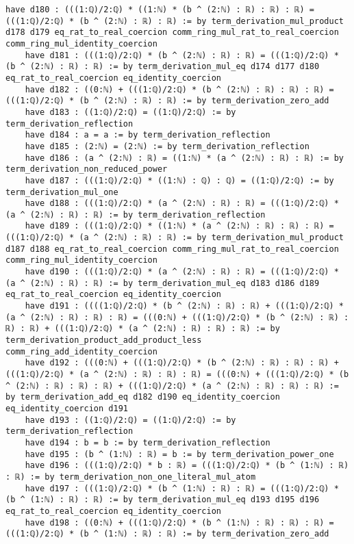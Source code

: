\documentclass{article}
\begin{document}
\begin{tcolorbox}[colback=white!10, width=\linewidth]
\begin{lstlisting}[language=Lean4]
    have d180 : (((1:ℚ)/2:ℚ) * ((1:ℕ) * (b ^ (2:ℕ) : ℝ) : ℝ) : ℝ) = (((1:ℚ)/2:ℚ) * (b ^ (2:ℕ) : ℝ) : ℝ) := by term_derivation_mul_product d178 d179 eq_rat_to_real_coercion comm_ring_mul_rat_to_real_coercion comm_ring_mul_identity_coercion
    have d181 : (((1:ℚ)/2:ℚ) * (b ^ (2:ℕ) : ℝ) : ℝ) = (((1:ℚ)/2:ℚ) * (b ^ (2:ℕ) : ℝ) : ℝ) := by term_derivation_mul_eq d174 d177 d180 eq_rat_to_real_coercion eq_identity_coercion
    have d182 : ((0:ℕ) + (((1:ℚ)/2:ℚ) * (b ^ (2:ℕ) : ℝ) : ℝ) : ℝ) = (((1:ℚ)/2:ℚ) * (b ^ (2:ℕ) : ℝ) : ℝ) := by term_derivation_zero_add
    have d183 : ((1:ℚ)/2:ℚ) = ((1:ℚ)/2:ℚ) := by term_derivation_reflection
    have d184 : a = a := by term_derivation_reflection
    have d185 : (2:ℕ) = (2:ℕ) := by term_derivation_reflection
    have d186 : (a ^ (2:ℕ) : ℝ) = ((1:ℕ) * (a ^ (2:ℕ) : ℝ) : ℝ) := by term_derivation_non_reduced_power
    have d187 : (((1:ℚ)/2:ℚ) * ((1:ℕ) : ℚ) : ℚ) = ((1:ℚ)/2:ℚ) := by term_derivation_mul_one
    have d188 : (((1:ℚ)/2:ℚ) * (a ^ (2:ℕ) : ℝ) : ℝ) = (((1:ℚ)/2:ℚ) * (a ^ (2:ℕ) : ℝ) : ℝ) := by term_derivation_reflection
    have d189 : (((1:ℚ)/2:ℚ) * ((1:ℕ) * (a ^ (2:ℕ) : ℝ) : ℝ) : ℝ) = (((1:ℚ)/2:ℚ) * (a ^ (2:ℕ) : ℝ) : ℝ) := by term_derivation_mul_product d187 d188 eq_rat_to_real_coercion comm_ring_mul_rat_to_real_coercion comm_ring_mul_identity_coercion
    have d190 : (((1:ℚ)/2:ℚ) * (a ^ (2:ℕ) : ℝ) : ℝ) = (((1:ℚ)/2:ℚ) * (a ^ (2:ℕ) : ℝ) : ℝ) := by term_derivation_mul_eq d183 d186 d189 eq_rat_to_real_coercion eq_identity_coercion
    have d191 : ((((1:ℚ)/2:ℚ) * (b ^ (2:ℕ) : ℝ) : ℝ) + (((1:ℚ)/2:ℚ) * (a ^ (2:ℕ) : ℝ) : ℝ) : ℝ) = (((0:ℕ) + (((1:ℚ)/2:ℚ) * (b ^ (2:ℕ) : ℝ) : ℝ) : ℝ) + (((1:ℚ)/2:ℚ) * (a ^ (2:ℕ) : ℝ) : ℝ) : ℝ) := by term_derivation_product_add_product_less comm_ring_add_identity_coercion
    have d192 : (((0:ℕ) + (((1:ℚ)/2:ℚ) * (b ^ (2:ℕ) : ℝ) : ℝ) : ℝ) + (((1:ℚ)/2:ℚ) * (a ^ (2:ℕ) : ℝ) : ℝ) : ℝ) = (((0:ℕ) + (((1:ℚ)/2:ℚ) * (b ^ (2:ℕ) : ℝ) : ℝ) : ℝ) + (((1:ℚ)/2:ℚ) * (a ^ (2:ℕ) : ℝ) : ℝ) : ℝ) := by term_derivation_add_eq d182 d190 eq_identity_coercion eq_identity_coercion d191
    have d193 : ((1:ℚ)/2:ℚ) = ((1:ℚ)/2:ℚ) := by term_derivation_reflection
    have d194 : b = b := by term_derivation_reflection
    have d195 : (b ^ (1:ℕ) : ℝ) = b := by term_derivation_power_one
    have d196 : (((1:ℚ)/2:ℚ) * b : ℝ) = (((1:ℚ)/2:ℚ) * (b ^ (1:ℕ) : ℝ) : ℝ) := by term_derivation_non_one_literal_mul_atom
    have d197 : (((1:ℚ)/2:ℚ) * (b ^ (1:ℕ) : ℝ) : ℝ) = (((1:ℚ)/2:ℚ) * (b ^ (1:ℕ) : ℝ) : ℝ) := by term_derivation_mul_eq d193 d195 d196 eq_rat_to_real_coercion eq_identity_coercion
    have d198 : ((0:ℕ) + (((1:ℚ)/2:ℚ) * (b ^ (1:ℕ) : ℝ) : ℝ) : ℝ) = (((1:ℚ)/2:ℚ) * (b ^ (1:ℕ) : ℝ) : ℝ) := by term_derivation_zero_add

\end{lstlisting}
\end{tcolorbox}
\end{document}
